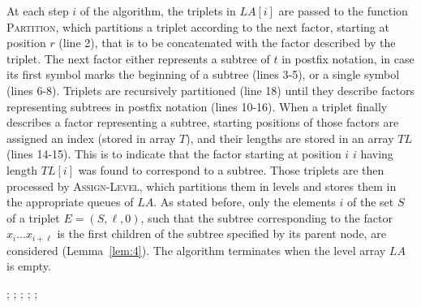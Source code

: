\documentclass[preprint,12pt]{elsarticle}
\begin{document}
At each step $i$ of the algorithm, the triplets in $\textit{LA}[i]$ are passed to the function \textsc{Partition},
which partitions a triplet according to the next factor, starting at position $r$ (line 2), 
that is to be concatenated with the factor described by the triplet. 
The next factor either represents a subtree of $t$ in postfix notation, in case its first symbol marks the beginning of 
a subtree (lines 3-5), or a single symbol (lines 6-8). Triplets are recursively partitioned (line 18) until they describe 
factors representing subtrees in postfix notation (lines 10-16).
When a triplet finally describes a factor representing a subtree, starting positions of those factors are assigned an index (stored in array $T$),
and their lengths are stored in an array $\textit{TL}$ (lines 14-15). This is to indicate that the factor starting at position $i$ 
$i$ having length $\textit{TL}[i]$ was found to correspond to a subtree.
Those triplets are then processed by \textsc{Assign-Level}, which partitions them in levels and stores them in the appropriate queues of $\textit{LA}$. 
As stated before, only the elements $i$ of the set $S$ of a triplet $E=(S,\ell,0)$, such that the subtree 
corresponding to the factor $x_i \ldots x_{i+\ell}$ is the first 
children of the subtree specified by its parent node, are considered (Lemma~\ref{lem:4}). 
The algorithm terminates when the level array $\textit{LA}$ is empty.




\begin{algorithm}
\begin{algorithmic}[1]
 ;
  ;
  ;
 \ENDIF
\ENDFOR
{}
 ;
\ENDFOR
{};
\end{algorithmic}
\end{algorithm}
\end{document}
